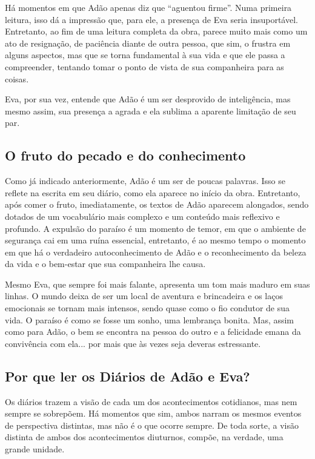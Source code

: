 \documentclass{extarticle}
\begin{document}
Há momentos em que Adão apenas diz que ``aguentou firme''. Numa primeira
leitura, isso dá a impressão que, para ele, a presença de Eva seria
insuportável. Entretanto, ao fim de uma leitura completa da obra, parece
muito mais como um ato de resignação, de paciência diante de outra
pessoa, que sim, o frustra em alguns aspectos, mas que se torna
fundamental à sua vida e que ele passa a compreender, tentando tomar o
ponto de vista de sua companheira para as coisas.

Eva, por sua vez, entende que Adão é um ser desprovido de inteligência,
mas mesmo assim, sua presença a agrada e ela sublima a aparente
limitação de seu par.

\subsection{O fruto do pecado e do conhecimento}

Como já indicado anteriormente, Adão é um ser de poucas palavras. Isso
se reflete na escrita em seu diário, como ela aparece no início da obra.
Entretanto, após comer o fruto, imediatamente, os textos de Adão
aparecem alongados, sendo dotados de um vocabulário mais complexo e um
conteúdo mais reflexivo e profundo. A expulsão do paraíso é um momento
de temor, em que o ambiente de segurança cai em uma ruína essencial,
entretanto, é ao mesmo tempo o momento em que há o verdadeiro
autoconhecimento de Adão e o reconhecimento da beleza da vida e o
bem-estar que sua companheira lhe causa.

Mesmo Eva, que sempre foi mais falante, apresenta um tom mais maduro em
suas linhas. O mundo deixa de ser um local de aventura e brincadeira e
os laços emocionais se tornam mais intensos, sendo quase como o fio
condutor de sua vida. O paraíso é como se fosse um sonho, uma lembrança
bonita. Mas, assim como para Adão, o bem se encontra na pessoa do outro
e a felicidade emana da convivência com ela... por mais que às vezes
seja deveras estressante.

\subsection{Por que ler os Diários de Adão e Eva?}

Os diários trazem a visão de cada um dos acontecimentos cotidianos, mas
nem sempre se sobrepõem. Há momentos que sim, ambos narram os mesmos
eventos de perspectiva distintas, mas não é o que ocorre sempre. De toda
sorte, a visão distinta de ambos dos acontecimentos diuturnos, compõe,
na verdade, uma grande unidade.
\end{document}
